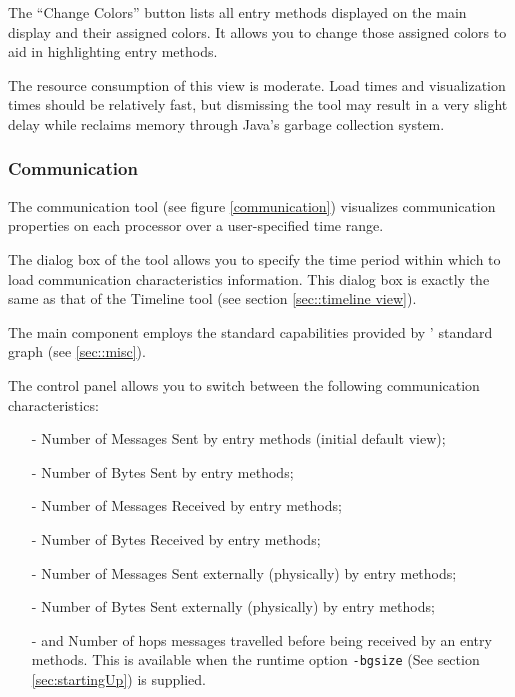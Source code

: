 \documentclass[10pt]{article}
\begin{document}
\begin{itemize}
The ``Change Colors'' button lists all entry methods displayed on the
main display and their assigned colors. It allows you to change those
assigned colors to aid in highlighting entry methods.

The resource consumption of this view is moderate. Load times and
visualization times should be relatively fast, but dismissing the tool
may result in a very slight delay while \projections{} reclaims memory
through Java's garbage collection system.

\end{itemize}

\subsubsection{Communication}
\label{sec::communication}

The communication tool (see figure \ref{communication}) visualizes
communication properties on each processor over a user-specified time
range.

The dialog box of the tool allows you to specify the time period
within which to load communication characteristics information. This
dialog box is exactly the same as that of the Timeline tool (see
section \ref{sec::timeline view}).

The main component employs the standard capabilities provided by
\projections{}' standard graph (see \ref{sec::misc}).

The control panel allows you to switch between the following
communication characteristics:

\begin{itemize}
\item[-] Number of Messages Sent by entry methods (initial default view);
\item[-] Number of Bytes Sent by entry methods;
\item[-] Number of Messages Received by entry methods;
\item[-] Number of Bytes Received by entry methods;
\item[-] Number of Messages Sent externally (physically) by entry methods;
\item[-] Number of Bytes Sent externally (physically) by entry methods;
\item[-] and Number of hops messages travelled before being received
by an entry methods. This is available when the runtime option {\tt -bgsize}
(See section \ref{sec:startingUp}) is supplied.
\end{itemize}
\end{document}
